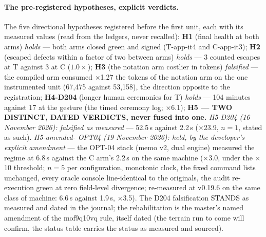 \documentclass[11pt,a4paper]{article}
\begin{document}
\paragraph{The pre-registered hypotheses, explicit verdicts.} The five
directional hypotheses registered before the first unit, each with its
measured values (read from the ledgers, never recalled): \textbf{H1}
(final health at both arms) \emph{holds} --- both arms closed green
and signed (T-app-it4 and C-app-it3); \textbf{H2} (escaped defects
within a factor of two between arms) \emph{holds} --- 3 counted
escapes at T against 3 at C ($1.0\times$); \textbf{H3} (the notation
arm costlier in tokens) \emph{falsified} --- the compiled arm consumed
$\times$1.27 the tokens of the notation arm on the one instrumented
unit (67{,}475 against 53{,}158), the direction opposite to the
registration; \textbf{H4-D204} (longer human ceremonies for T)
\emph{holds} --- 104 minutes against 17 at the gesture (the timed
ceremony log; $\times$6.1); \textbf{H5 --- TWO DISTINCT, DATED VERDICTS, never fused into one.}
\emph{H5-D204 (16 November 2026): falsified as measured} --- 52.5\,s
against 2.2\,s ($\times$23.9, $n{=}1$, stated as such). \emph{H5-amended-
OPT04 (19 November 2026): held, by the developer's explicit amendment}
--- the OPT-04 stack (memo v2, dual engine) measured the regime at
6.8\,s against the C arm's 2.2\,s on the same machine ($\times$3.0,
under the $\times$10 threshold; $n{=}5$ per configuration, monotonic
clock, the fixed command lists unchanged, every oracle console
line-identical to the originals, the audit re-execution green at zero
field-level divergence; re-measured at v0.19.6 on the same class of
machine: 6.6\,s against 1.9\,s, $\times$3.5). The D204 falsification
STANDS as measured and dated in the journal; the rehabilitation is
the master's named amendment of the mof9q10vq rule, itself dated
(the terrain run to come will confirm, the status table
carries the status as measured and sourced).
\end{document}
